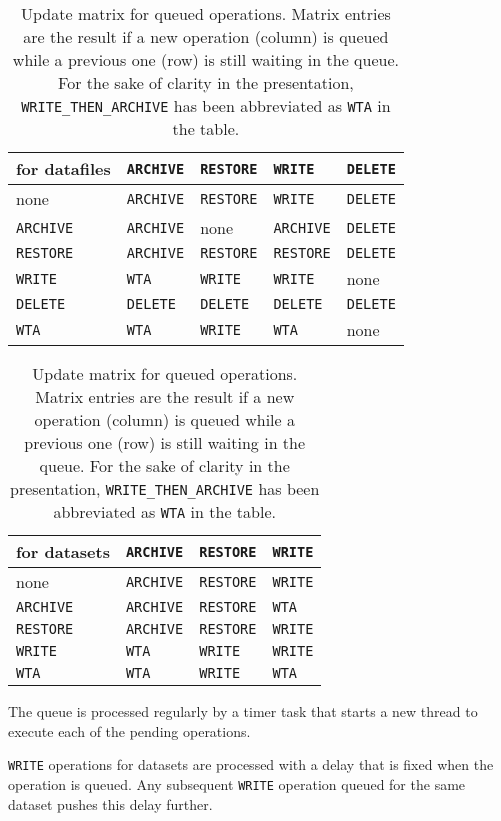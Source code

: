 \documentclass[paper=a4]{scrartcl}
\begin{document}
\begin{table}[h]
 \begin{tabular}{l|llll}
  for datafiles    & \texttt{ARCHIVE} & \texttt{RESTORE} & \texttt{WRITE}   & \texttt{DELETE} \\
  \hline
  none             & \texttt{ARCHIVE} & \texttt{RESTORE} & \texttt{WRITE}   & \texttt{DELETE} \\
  \texttt{ARCHIVE} & \texttt{ARCHIVE} & none             & \texttt{ARCHIVE} & \texttt{DELETE} \\
  \texttt{RESTORE} & \texttt{ARCHIVE} & \texttt{RESTORE} & \texttt{RESTORE} & \texttt{DELETE} \\
  \texttt{WRITE}   & \texttt{WTA}     & \texttt{WRITE}   & \texttt{WRITE}   & none \\
  \texttt{DELETE}  & \texttt{DELETE}  & \texttt{DELETE}  & \texttt{DELETE}  & \texttt{DELETE} \\
  \texttt{WTA}     & \texttt{WTA}     & \texttt{WRITE}   & \texttt{WTA}     & none \\
 \end{tabular}
 \bigbreak
 \begin{tabular}{l|lll}
  for datasets     & \texttt{ARCHIVE} & \texttt{RESTORE} & \texttt{WRITE} \\
  \hline
  none             & \texttt{ARCHIVE} & \texttt{RESTORE} & \texttt{WRITE} \\
  \texttt{ARCHIVE} & \texttt{ARCHIVE} & \texttt{RESTORE} & \texttt{WTA} \\
  \texttt{RESTORE} & \texttt{ARCHIVE} & \texttt{RESTORE} & \texttt{WRITE} \\
  \texttt{WRITE}   & \texttt{WTA}     & \texttt{WRITE}   & \texttt{WRITE} \\
  \texttt{WTA}     & \texttt{WTA}     & \texttt{WRITE}   & \texttt{WTA} \\
 \end{tabular}
 \caption{Update matrix for queued operations.  Matrix entries are the
   result if a new operation (column) is queued while a previous one
   (row) is still waiting in the queue.  For the sake of clarity in
   the presentation, \texttt{WRITE\_THEN\_ARCHIVE} has been
   abbreviated as \texttt{WTA} in the table.}
 \label{tab:fsm}
\end{table}

The queue is processed regularly by a timer task that starts a new
thread to execute each of the pending operations.

\texttt{WRITE} operations for datasets are processed with a delay
that is fixed when the operation is queued.  Any subsequent
\texttt{WRITE} operation queued for the same dataset pushes this
delay further.
\end{document}
